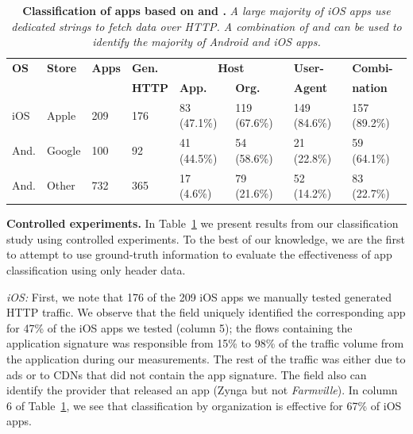 \begin{table} 
     \centering
     \begin{small}
     \begin{tabular}{|p{}|p{}|p{}|p{}|p{}|p{}|p{}|p{}|}
        \hline
        {\bf OS}&{\bf Store}&{\bf Apps}&{\bf Gen.}&\multicolumn{2}{|c|}{\bf Host} & {\bf User-}&{\bf Combi-} \tabularnewline
        \cline{5-6}    
             &        &     & {\bf HTTP} & {\bf App. } & {\bf Org.}& \bf{Agent}   & \bf{nation}  \tabularnewline                
        \hline    
        iOS  & Apple  & 209 & 176 & 83 (47.1\%)  &  119 (67.6\%)   &  149 (84.6\%)& 157 (89.2\%) \tabularnewline
        \hline
        And. & Google & 100 & 92  & 41 (44.5\%)  &  54 (58.6\%)    &  21 (22.8\%) &  59 (64.1\%)  \tabularnewline
        \hline    
        And. & Other  & 732 &  365 &  17 (4.6\%) &  79 (21.6\%)    &  52 (14.2\%)  & 83 (22.7\%)  \tabularnewline
        \hline
     \end{tabular}
     \end{small}
     \caption{\textbf{Classification of apps based on \httphost and \useragent.} \emph{ A large majority of iOS apps use dedicated \useragent strings to fetch data over HTTP. A combination of \useragent and \httphost can be used to identify the majority of Android and iOS apps.}}
     \label{tab:classification-success}
\vspace{\postfigspace}
\end{table}



\noindent\textbf{Controlled experiments.}
In Table~\ref{tab:classification-success} we present results from our classification study using controlled experiments. To 
the best of our knowledge, we are the first to attempt to use ground-truth information to evaluate the 
effectiveness of app classification using only header data.

\emph{iOS:}
First, we note that 176 of the 209 iOS apps we manually tested generated HTTP traffic.
We observe that the \httphost field uniquely identified the corresponding app for 47\% of the iOS apps we tested (column 5); the flows containing the application signature was responsible from 15\% to 98\% of the traffic volume from the application during  our measurements. The rest of the traffic was either due to ads or to CDNs that did not contain the app signature.  
The \httphost field also can identify the provider that released an app (\eg Zynga but not \emph{Farmville}).
In column 6 of Table~\ref{tab:classification-success}, we see that classification by organization is effective for 67\% of iOS apps. 

